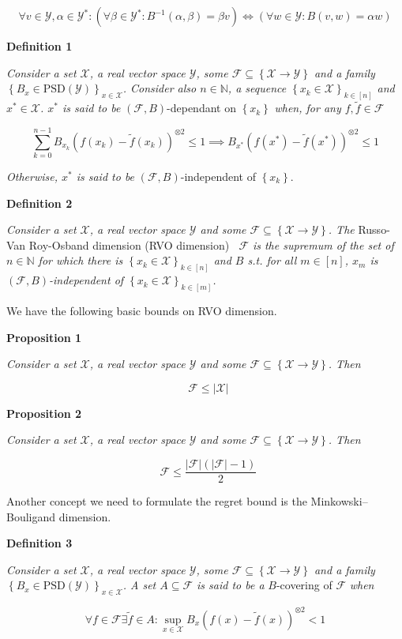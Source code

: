 \documentclass[a4paper]{article}
\newcommand{\Co}[1]{}
\newcommand{\AP}[1]{\left(#1\right)}
\newcommand{\AC}[1]{\left\{#1\right\}}
\newcommand{\Nats}{\mathbb{N}}
\newcommand{\PSD}{\mathrm{PSD}}
\newcommand{\Abs}[1]{\left\vert #1 \right\vert}
\newcommand{\B}{B}
\newcommand{\X}{\mathcal{X}}
\newcommand{\Y}{\mathcal{Y}}
\newcommand{\F}{\mathcal{F}}
\DeclareMathOperator{\RVO}{\dim_{RVO}}
\begin{document}
$$\forall v\in\Y,\alpha\in\Y^*:\AP{\forall\beta\in\Y^*:\B ^{-1}(\alpha,\beta)=\beta v}\iff\AP{\forall w\in\Y:\B (v,w)=\alpha w}$$ 

\textbf{Definition 1}\Co{b}

\textit{Consider a set $\X$, a real vector space $\Y$, some $\F\subseteq\AC{\X\rightarrow\Y}$ and a family $\AC{\B _x\in\PSD(\Y)}_{x\in\X}$. Consider also $n\in\Nats$, a sequence $\AC{x_k\in\X}_{k\in[n]}$ and $x^*\in\X$. $x^*$ is said to be} $\AP{\F,\B }$-dependant on $\AC{x_k}$ \textit{when, for any $f,\tilde{f}\in\F$}\Co{i}

$$\sum_{k=0}^{n-1}\B _{x_k}\AP{f\AP{x_k}-\tilde{f}\AP{x_k}}^{\otimes 2}\leq1\implies \B _{x^*}\AP{f\AP{x^*}-\tilde{f}\AP{x^*}}^{\otimes 2}\leq1$$

\textit{Otherwise, $x^*$ is said to be}\Co{i} $\AP{\F,\B }$-independent of $\AC{x_k}$.

\textbf{Definition 2}\Co{b}

\textit{Consider a set $\X$, a real vector space $\Y$ and some $\F\subseteq\AC{\X\rightarrow\Y}$. The}\Co{i} Russo-Van Roy-Osband dimension (RVO dimension) $\RVO{\F}$ \textit{is the supremum of the set of $n\in\Nats$ for which there is $\AC{x_k\in\X}_{k\in[n]}$ and $\B $ s.t. for all $m\in[n]$, $x_m$ is $\AP{\F,\B }$-independent of $\AC{x_k\in\X}_{k\in[m]}$.}\Co{i}

We have the following basic bounds on RVO dimension.

\textbf{Proposition 1}\Co{b}

\textit{Consider a set $\X$, a real vector space $\Y$ and some $\F\subseteq\AC{\X\rightarrow\Y}$. Then}\Co{i}

$$\RVO{\F}\leq\Abs{\X}$$

\textbf{Proposition 2}\Co{b}

\textit{Consider a set $\X$, a real vector space $\Y$ and some $\F\subseteq\AC{\X\rightarrow\Y}$. Then}\Co{i}

$$\RVO{\F}\leq\frac{\Abs{\F}\AP{\Abs{\F}-1}}{2}$$

Another concept we need to formulate the regret bound is the Minkowski–Bouligand dimension.

\textbf{Definition 3}\Co{b}

\textit{Consider a set $\X$, a real vector space $\Y$, some $\F\subseteq\AC{\X\rightarrow\Y}$ and a family $\AC{\B _x\in\PSD(\Y)}_{x\in\X}$. A set $A\subseteq\F$ is said to be a}\Co{i} $\B $-covering of $\F$ \textit{when}\Co{i}

$$\forall f\in\F\exists\tilde{f}\in A: \sup_{x\in\X}{\B _x\AP{f(x)-\tilde{f}(x)}^{\otimes 2}}<1$$
\end{document}
